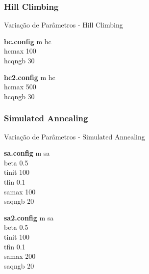 \documentclass[compress, hide notes]{beamer}
\begin{document}
		
			\subsubsection{Hill Climbing}


				\begin{frame}[fragile]{Variação de Parâmetros - Hill Climbing}
					
					\begin{minipage}{5cm}
						
						\begin{block}{\textbf{hc.config}}
							m hc\\
							hcmax 100\\
							hcqngb 30
						\end{block}
					\end{minipage}\hfill
					\begin{minipage}{5cm}
						\begin{block}{\textbf{hc2.config}}
							m hc\\
							hcmax 500\\
							hcqngb 30
						\end{block}
					\end{minipage}
				\end{frame}
                
                \subsubsection{Simulated Annealing}
				
				\begin{frame}[fragile]{Variação de Parâmetros - Simulated Annealing}
					\begin{minipage}{5cm}
                    
						\begin{block}{\textbf{sa.config}}
							m sa\\
                            beta 0.5\\
                            tinit 100\\
                            tfin 0.1\\
                            samax 100\\
                            saqngb 20
						\end{block}
					\end{minipage}\hfill
					\begin{minipage}{5cm}
                    
						\begin{block}{\textbf{sa2.config}}
                              m sa\\
                              beta 0.5\\
                              tinit 100\\
                              tfin 0.1\\
                              samax 200\\
                              saqngb 20
						\end{block}
					\end{minipage}
				\end{frame}
                
\end{document}
